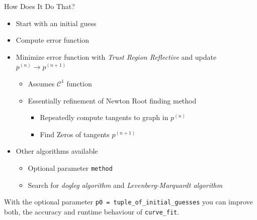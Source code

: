 \begin{frame}{How Does It Do That?}
%
\begin{itemize}
\item Start with an initial guess 
\item Compute error function 
\item Minimize error function with \emph{Trust Region Reflective} and update $p^{(n)} \to p^{(n+1)}$
	\begin{itemize}
	\item Assumes $\mathcal{C}^{1}$ function
	\item Essentially refinement of Newton Root finding method
		\begin{itemize}
		\item Repeatedly compute tangents to graph in $p^{(n)}$
		\item Find Zeros of tangents \Thus $p^{(n+1)}$
		\end{itemize}
	\end{itemize}
\item Other algorithms available
	\begin{itemize}
	\item Optional parameter \texttt{method}
	\item Search for \emph{dogleg algorithm} and \emph{Levenberg-Marquardt algorithm}
	\end{itemize}
\end{itemize}
%
\begin{hintbox}
\small
With the optional parameter \texttt{p0 = tuple\_of\_initial\_guesses} you can improve both, the accuracy and runtime behaviour of \texttt{curve\_fit}.
\end{hintbox}
%
\end{frame}


